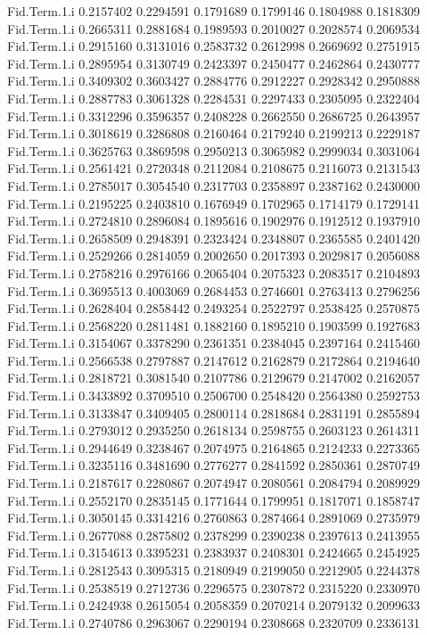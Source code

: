 \documentclass[11pt]{article} %
\begin{document}
\begin{Schunk}
\begin{Soutput}
Fid.Term.1.i 0.2157402 0.2294591 0.1791689 0.1799146 0.1804988 0.1818309
Fid.Term.1.i 0.2665311 0.2881684 0.1989593 0.2010027 0.2028574 0.2069534
Fid.Term.1.i 0.2915160 0.3131016 0.2583732 0.2612998 0.2669692 0.2751915
Fid.Term.1.i 0.2895954 0.3130749 0.2423397 0.2450477 0.2462864 0.2430777
Fid.Term.1.i 0.3409302 0.3603427 0.2884776 0.2912227 0.2928342 0.2950888
Fid.Term.1.i 0.2887783 0.3061328 0.2284531 0.2297433 0.2305095 0.2322404
Fid.Term.1.i 0.3312296 0.3596357 0.2408228 0.2662550 0.2686725 0.2643957
Fid.Term.1.i 0.3018619 0.3286808 0.2160464 0.2179240 0.2199213 0.2229187
Fid.Term.1.i 0.3625763 0.3869598 0.2950213 0.3065982 0.2999034 0.3031064
Fid.Term.1.i 0.2561421 0.2720348 0.2112084 0.2108675 0.2116073 0.2131543
Fid.Term.1.i 0.2785017 0.3054540 0.2317703 0.2358897 0.2387162 0.2430000
Fid.Term.1.i 0.2195225 0.2403810 0.1676949 0.1702965 0.1714179 0.1729141
Fid.Term.1.i 0.2724810 0.2896084 0.1895616 0.1902976 0.1912512 0.1937910
Fid.Term.1.i 0.2658509 0.2948391 0.2323424 0.2348807 0.2365585 0.2401420
Fid.Term.1.i 0.2529266 0.2814059 0.2002650 0.2017393 0.2029817 0.2056088
Fid.Term.1.i 0.2758216 0.2976166 0.2065404 0.2075323 0.2083517 0.2104893
Fid.Term.1.i 0.3695513 0.4003069 0.2684453 0.2746601 0.2763413 0.2796256
Fid.Term.1.i 0.2628404 0.2858442 0.2493254 0.2522797 0.2538425 0.2570875
Fid.Term.1.i 0.2568220 0.2811481 0.1882160 0.1895210 0.1903599 0.1927683
Fid.Term.1.i 0.3154067 0.3378290 0.2361351 0.2384045 0.2397164 0.2415460
Fid.Term.1.i 0.2566538 0.2797887 0.2147612 0.2162879 0.2172864 0.2194640
Fid.Term.1.i 0.2818721 0.3081540 0.2107786 0.2129679 0.2147002 0.2162057
Fid.Term.1.i 0.3433892 0.3709510 0.2506700 0.2548420 0.2564380 0.2592753
Fid.Term.1.i 0.3133847 0.3409405 0.2800114 0.2818684 0.2831191 0.2855894
Fid.Term.1.i 0.2793012 0.2935250 0.2618134 0.2598755 0.2603123 0.2614311
Fid.Term.1.i 0.2944649 0.3238467 0.2074975 0.2164865 0.2124233 0.2273365
Fid.Term.1.i 0.3235116 0.3481690 0.2776277 0.2841592 0.2850361 0.2870749
Fid.Term.1.i 0.2187617 0.2280867 0.2074947 0.2080561 0.2084794 0.2089929
Fid.Term.1.i 0.2552170 0.2835145 0.1771644 0.1799951 0.1817071 0.1858747
Fid.Term.1.i 0.3050145 0.3314216 0.2760863 0.2874664 0.2891069 0.2735979
Fid.Term.1.i 0.2677088 0.2875802 0.2378299 0.2390238 0.2397613 0.2413955
Fid.Term.1.i 0.3154613 0.3395231 0.2383937 0.2408301 0.2424665 0.2454925
Fid.Term.1.i 0.2812543 0.3095315 0.2180949 0.2199050 0.2212905 0.2244378
Fid.Term.1.i 0.2538519 0.2712736 0.2296575 0.2307872 0.2315220 0.2330970
Fid.Term.1.i 0.2424938 0.2615054 0.2058359 0.2070214 0.2079132 0.2099633
Fid.Term.1.i 0.2740786 0.2963067 0.2290194 0.2308668 0.2320709 0.2336131

\end{Soutput}
\end{Schunk}
\end{document}
